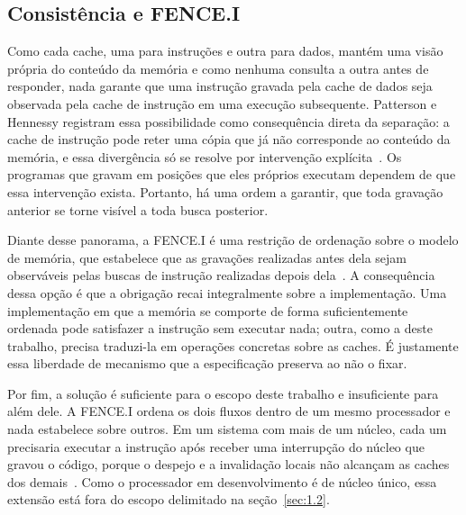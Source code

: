 \subsection{Consistência e FENCE.I}\label{sec:2.5.5}

Como cada cache, uma para instruções e outra para dados, mantém uma visão própria do conteúdo da memória e como nenhuma consulta a outra antes de responder, nada garante que uma instrução gravada pela cache de dados seja observada pela cache de instrução em uma execução subsequente. Patterson e Hennessy registram essa possibilidade como consequência direta da separação: a cache de instrução pode reter uma cópia que já não corresponde ao conteúdo da memória, e essa divergência só se resolve por intervenção explícita~\cite{patterson2020computer}. Os programas que gravam em posições que eles próprios executam dependem de que essa intervenção exista. Portanto, há uma ordem a garantir, que toda gravação anterior se torne visível a toda busca posterior.

Diante desse panorama, a FENCE.I é uma restrição de ordenação sobre o modelo de memória, que estabelece que as gravações realizadas antes dela sejam observáveis pelas buscas de instrução realizadas depois dela~\cite{waterman2019riscv}. A consequência dessa opção é que a obrigação recai integralmente sobre a implementação. Uma implementação em que a memória se comporte de forma suficientemente ordenada pode satisfazer a instrução sem executar nada; outra, como a deste trabalho, precisa traduzi-la em operações concretas sobre as caches. É justamente essa liberdade de mecanismo que a especificação preserva ao não o fixar.

Por fim, a solução é suficiente para o escopo deste trabalho e insuficiente para além dele. A FENCE.I ordena os dois fluxos dentro de um mesmo processador e nada estabelece sobre outros. Em um sistema com mais de um núcleo, cada um precisaria executar a instrução após receber uma interrupção do núcleo que gravou o código, porque o despejo e a invalidação locais não alcançam as caches dos demais~\cite{waterman2019riscv}. Como o processador em desenvolvimento é de núcleo único, essa extensão está fora do escopo delimitado na seção~\ref{sec:1.2}.
